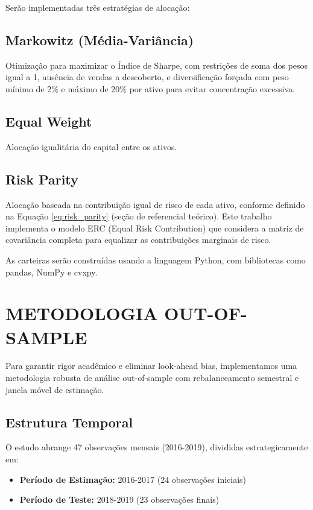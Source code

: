 Serão implementadas três estratégias de alocação:

\subsection{Markowitz (Média-Variância)}
Otimização para maximizar o Índice de Sharpe, com restrições de soma dos pesos igual a 1, ausência de vendas a descoberto, e diversificação forçada com peso mínimo de 2\% e máximo de 20\% por ativo para evitar concentração excessiva.

\subsection{Equal Weight}
Alocação igualitária do capital entre os ativos.

\subsection{Risk Parity}
Alocação baseada na contribuição igual de risco de cada ativo, conforme definido na Equação \ref{eq:risk_parity} (seção de referencial teórico). Este trabalho implementa o modelo ERC (Equal Risk Contribution) que considera a matriz de covariância completa para equalizar as contribuições marginais de risco.

As carteiras serão construídas usando a linguagem Python, com bibliotecas como pandas, NumPy e cvxpy.

\section{METODOLOGIA OUT-OF-SAMPLE}

Para garantir rigor acadêmico e eliminar look-ahead bias, implementamos uma metodologia robusta de análise out-of-sample com rebalanceamento semestral e janela móvel de estimação.

\subsection{Estrutura Temporal}

O estudo abrange 47 observações mensais (2016-2019), divididas estrategicamente em:
\begin{itemize}
    \item \textbf{Período de Estimação:} 2016-2017 (24 observações iniciais)
    \item \textbf{Período de Teste:} 2018-2019 (23 observações finais)
\end{itemize}

